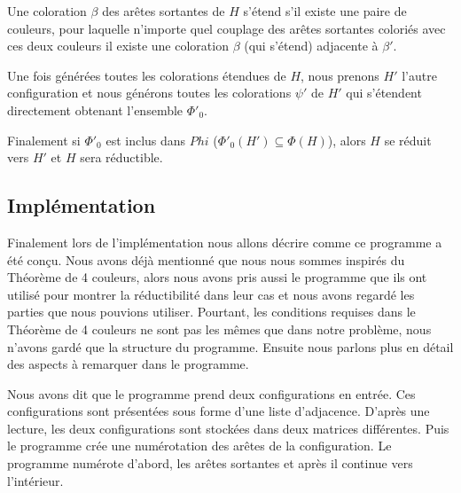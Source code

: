 \documentclass[10pt,a4paper]{article}
\newtheorem{definition}{Définition}
\begin{document}
Une coloration $\beta$ des arêtes sortantes de $H$ s'étend s'il existe une paire de couleurs, pour laquelle n'importe quel couplage des arêtes sortantes coloriés avec ces deux couleurs il existe une coloration $\beta$ (qui s'étend) adjacente à $\beta'$.

Une fois générées toutes les colorations étendues de $H$, nous prenons $H'$ l'autre configuration et nous générons toutes les colorations $\psi'$ de $H'$ qui s'étendent directement obtenant l'ensemble $\Phi'_0$.

Finalement si $\Phi'_0$ est inclus dans $Phi$ ($\Phi'_0(H')\subseteq \Phi(H)$), alors $H$ se réduit vers $H'$ et $H$ sera réductible.

\subsection{Implémentation}

Finalement lors de l'implémentation nous allons décrire comme ce programme a été conçu. Nous avons déjà mentionné que nous nous sommes inspirés du Théorème de 4 couleurs, alors nous avons pris aussi le programme que ils ont utilisé pour montrer la réductibilité dans leur cas et nous avons regardé les parties que nous pouvions utiliser. Pourtant, les conditions requises dans le Théorème de 4 couleurs ne sont pas les mêmes que dans notre problème,  nous n'avons gardé que la structure du programme. Ensuite nous parlons plus en détail des aspects à remarquer dans le programme.

Nous avons dit que le programme prend deux configurations en entrée. Ces configurations sont présentées sous forme d'une liste d'adjacence. D'après une lecture, les deux configurations sont stockées dans deux matrices différentes. Puis le programme crée une numérotation des arêtes de la configuration. Le programme numérote d'abord, les arêtes sortantes et après il continue vers l'intérieur. 


\end{document}
